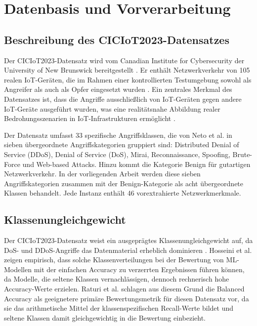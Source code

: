 \section{Datenbasis und Vorverarbeitung}\label{datenbasis}

\subsection{Beschreibung des CICIoT2023-Datensatzes}

Der CICIoT2023-Datensatz wird vom Canadian Institute for Cybersecurity der University of New Brunswick bereitgestellt \cite{neto2023ciciot2023}. Er enthält Netzwerkverkehr von 105 realen IoT-Geräten, die im Rahmen einer kontrollierten Testumgebung sowohl als Angreifer als auch als Opfer eingesetzt wurden \cite{neto2023ciciot2023}. Ein zentrales Merkmal des Datensatzes ist, dass die Angriffe ausschließlich von IoT-Geräten gegen andere IoT-Geräte ausgeführt wurden, was eine realitätsnahe Abbildung realer Bedrohungsszenarien in IoT-Infrastrukturen ermöglicht \cite{neto2023ciciot2023}.

Der Datensatz umfasst 33 spezifische Angriffsklassen, die von Neto et al. \cite{neto2023ciciot2023} in sieben übergeordnete Angriffskategorien gruppiert sind: Distributed Denial of Service (DDoS), Denial of Service (DoS), Mirai, Reconnaissance, Spoofing, Brute-Force und Web-based Attacks. Hinzu kommt die Kategorie Benign für gutartigen Netzwerkverkehr. In der vorliegenden Arbeit werden diese sieben Angriffskategorien zusammen mit der Benign-Kategorie als acht übergeordnete Klassen behandelt. Jede Instanz enthält 46 vorextrahierte Netzwerkmerkmale.

\subsection{Klassenungleichgewicht}

Der CICIoT2023-Datensatz weist ein ausgeprägtes Klassenungleichgewicht auf, da DoS- und DDoS-Angriffe das Datenmaterial erheblich dominieren \cite{raturi2026exploratory}. Hosseini et al. \cite{hosseini2025imbalance} zeigen empirisch, dass solche Klassenverteilungen bei der Bewertung von ML-Modellen mit der einfachen Accuracy zu verzerrten Ergebnissen führen können, da Modelle, die seltene Klassen vernachlässigen, dennoch rechnerisch hohe Accuracy-Werte erzielen. Raturi et al. \cite{raturi2026exploratory} schlagen aus diesem Grund die Balanced Accuracy als geeignetere primäre Bewertungsmetrik für diesen Datensatz vor, da sie das arithmetische Mittel der klassenspezifischen Recall-Werte bildet und seltene Klassen damit gleichgewichtig in die Bewertung einbezieht.

